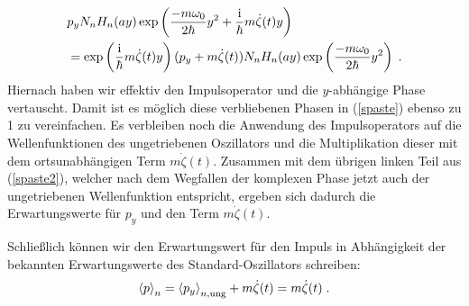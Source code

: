     \begin{align}
      &p_y N_nH_n(ay)\exp\left(\frac{-m\omega_0}{2\hbar}y^2+\frac{\text i}{\hbar}m\dot{\zeta}(t)y\right) \notag\\
      &= \exp\left(\frac{\text i}{\hbar}m\dot{\zeta}(t)y\right) (p_y+m\dot \zeta(t))N_nH_n(ay)\exp\left(\frac{-m\omega_0}{2\hbar}y^2\right) \;.
      \label{spaste2}
    \end{align}
    Hiernach haben wir effektiv den Impulsoperator und die $y$-abhängige Phase vertauscht.
    Damit ist es möglich diese verbliebenen Phasen in (\ref{spaste}) ebenso zu 1 zu vereinfachen.
    Es verbleiben noch die Anwendung des Impulsoperators auf die Wellenfunktionen des ungetriebenen Oszillators und die Multiplikation dieser mit dem ortsunabhängigen Term $m\dot \zeta(t)$.
    Zusammen mit dem übrigen linken Teil aus (\ref{spaste2}), welcher nach dem Wegfallen der komplexen Phase jetzt auch der ungetriebenen Wellenfunktion entspricht, ergeben sich dadurch die Erwartungswerte für $p_y$ und den Term $m\dot{\zeta}(t)$.

    Schließlich können wir den Erwartungswert für den Impuls in Abhängigkeit der bekannten Erwartungswerte des Standard-Oszillators schreiben:
    \begin{align}
      \braket{p}_n = \braket{p_y}_{n,\text{ung}} + m\dot{\zeta}(t) = m\dot{\zeta}(t) \; .
      \label{erwartungswert_p_einzelner}
    \end{align}

